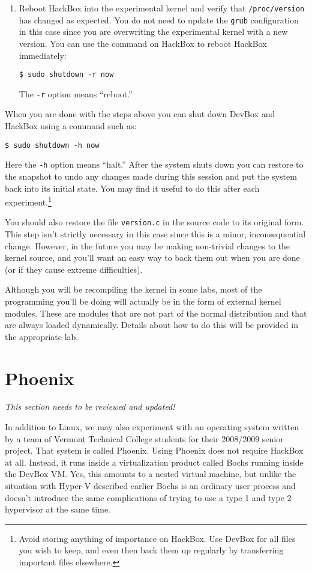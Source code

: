 \documentclass{article}
\newcommand{\command}[1]{\texttt{#1}}
\newcommand{\filename}[1]{\texttt{#1}}
\begin{document}
\begin{enumerate}
\item Reboot HackBox into the experimental kernel and verify that \filename{/proc/version} has
  changed as expected. You do not need to update the \command{grub} configuration in this case
  since you are overwriting the experimental kernel with a new version. You can use the command
  on HackBox to reboot HackBox immediately:
\begin{Verbatim}
$ sudo shutdown -r now
\end{Verbatim}
  The \texttt{-r} option means ``reboot.''

\end{enumerate}

When you are done with the steps above you can shut down DevBox and HackBox using a command such
as:
\begin{Verbatim}
$ sudo shutdown -h now
\end{Verbatim}
Here the \texttt{-h} option means ``halt.'' After the system shuts down you can restore to the
snapshot to undo any changes made during this session and put the system back into its initial
state. You may find it useful to do this after each experiment.\footnote{Avoid storing anything
of importance on HackBox. Use DevBox for all files you wish to keep, and even then back them up
regularly by transferring important files elsewhere.}

You should also restore the file \filename{version.c} in the source code to its original form.
This step isn't strictly necessary in this case since this is a minor, inconsequential change.
However, in the future you may be making non-trivial changes to the kernel source, and you'll
want an easy way to back them out when you are done (or if they cause extreme difficulties).

Although you will be recompiling the kernel in some labs, most of the programming you'll be
doing will actually be in the form of external kernel modules. These are modules that are not
part of the normal distribution and that are always loaded dynamically. Details about how to do
this will be provided in the appropriate lab.

\section{Phoenix}

\textit{This section needs to be reviewed and updated!}

In addition to Linux, we may also experiment with an operating system written by a team of
Vermont Technical College students for their 2008/2009 senior project. That system is called
Phoenix. Using Phoenix does not require HackBox at all. Instead, it runs inside a virtualization
product called Bochs running inside the DevBox VM. Yes, this amounts to a nested virtual
machine, but unlike the situation with Hyper-V described earlier Bochs is an ordinary user
process and doesn't introduce the same complications of trying to use a type 1 and type 2
hypervisor at the same time.
\end{document}
